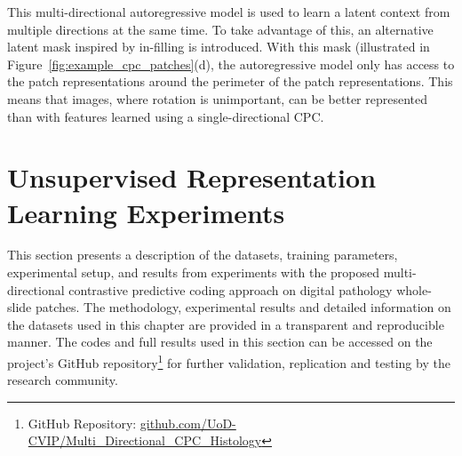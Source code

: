 This multi-directional autoregressive model is used to learn a latent context from multiple directions at the same time. To take advantage of this, an alternative latent mask inspired by in-filling is introduced. With this mask (illustrated in Figure~\ref{fig:example_cpc_patches}(d), the autoregressive model only has access to the patch representations around the perimeter of the patch representations. This means that images, where rotation is unimportant, can be better represented than with features learned using a single-directional CPC.



\section{Unsupervised Representation Learning Experiments}
\label{sec:unsupervised_experiments}
This section presents a description of the datasets, training parameters, experimental setup, and results from experiments with the proposed multi-directional contrastive predictive coding approach on digital pathology whole-slide patches. The methodology, experimental results and detailed information on the datasets used in this chapter are provided in a transparent and reproducible manner. The codes and full results used in this section can be accessed on the project's GitHub repository\footnote{GitHub Repository: \url{github.com/UoD-CVIP/Multi_Directional_CPC_Histology}} for further validation, replication and testing by the research community.

